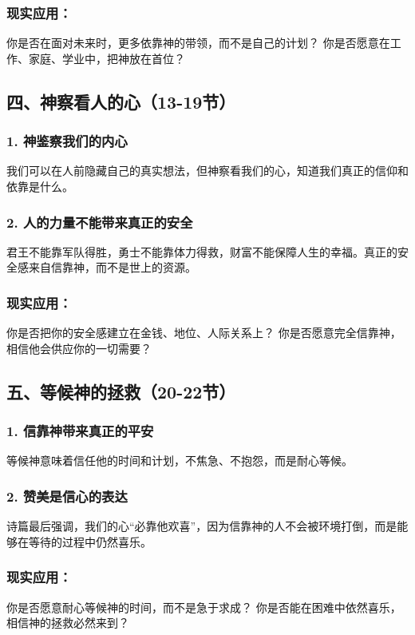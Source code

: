 \documentclass[a4paper, 12pt]{article}
\begin{document}
\subsubsection*{现实应用：}
你是否在面对未来时，更多依靠神的带领，而不是自己的计划？
你是否愿意在工作、家庭、学业中，把神放在首位？
\subsection*{四、神察看人的心（13-19节）}

\subsubsection*{1. 神鉴察我们的内心}
我们可以在人前隐藏自己的真实想法，但神察看我们的心，知道我们真正的信仰和依靠是什么。

\subsubsection*{2. 人的力量不能带来真正的安全}
君王不能靠军队得胜，勇士不能靠体力得救，财富不能保障人生的幸福。真正的安全感来自信靠神，而不是世上的资源。

\subsubsection*{现实应用：}
你是否把你的安全感建立在金钱、地位、人际关系上？
你是否愿意完全信靠神，相信他会供应你的一切需要？
\subsection*{五、等候神的拯救（20-22节）}

\subsubsection*{1. 信靠神带来真正的平安}
等候神意味着信任他的时间和计划，不焦急、不抱怨，而是耐心等候。

\subsubsection*{2. 赞美是信心的表达}
诗篇最后强调，我们的心“必靠他欢喜”，因为信靠神的人不会被环境打倒，而是能够在等待的过程中仍然喜乐。

\subsubsection*{现实应用：}
你是否愿意耐心等候神的时间，而不是急于求成？
你是否能在困难中依然喜乐，相信神的拯救必然来到？
\end{document}
